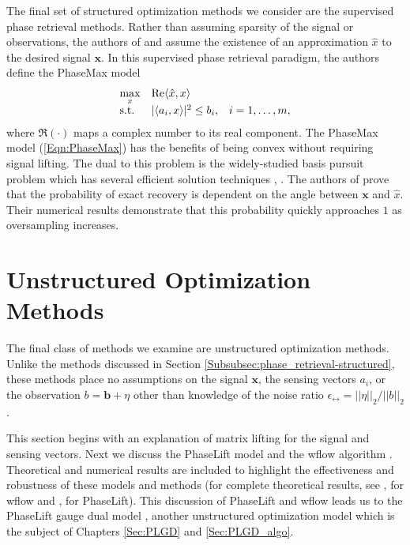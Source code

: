 The final set of structured optimization methods we consider are the supervised phase retrieval methods.
Rather than assuming sparsity of the signal or observations, the authors of \cite{goldstein2018phasemax} and \cite{bahmani2016phase} assume the existence of an approximation $\hat{x}$ to the desired signal $\mathbf{x}$.  In this supervised phase retrieval paradigm, the authors define the PhaseMax model
\begin{equation} 			\label{Eqn:PhaseMax}
\begin{array}{lll}
	\max\limits_x	&	\mathrm{Re} \langle \hat{x}, x \rangle 		\\
	\textnormal{s.t.} 			&	| \langle a_i, x \rangle |^2 \leq b_i, 	&	i = 1, \ldots, m,
\end{array}
\end{equation} 
where $\Re(\cdot)$ maps a complex number to its real component.  The PhaseMax model (\ref{Eqn:PhaseMax}) has the benefits of being convex without requiring signal lifting.  The dual to this problem is the widely-studied basis pursuit problem which has several efficient solution techniques \cite{chen2001atomic}, \cite{candes2006stable}.  The authors of \cite{goldstein2018phasemax} prove that the probability of exact recovery is dependent on the angle between $\mathbf{x}$ and $\hat{x}$.
Their numerical results demonstrate that this probability quickly approaches $1$ as oversampling increases.





\section{Unstructured Optimization Methods}	 	\label{Subsubsec:phase_retrieval-unstructured}


The final class of methods we examine are unstructured optimization methods.  Unlike the methods discussed in Section \ref{Subsubsec:phase_retrieval-structured}, these methods place no assumptions on the signal $\mathbf{x}$, the sensing vectors $a_i$, or the observation $b = \mathbf{b} + \eta$ other than knowledge of the noise ratio $\epsilon_\rel = ||\eta||_2 / ||b||_2$.

This section begins with an explanation of matrix lifting for the signal and sensing vectors.  
Next we discuss the PhaseLift model \cite{DBLP:journals/siamis/CandesESV13} and the wflow algorithm \cite{DBLP:journals/tit/CandesLS15}.   
Theoretical and numerical results are included to highlight the effectiveness and robustness of these models and methods (for complete theoretical results, see \cite{DBLP:journals/tit/CandesLS15},  \cite{sun2016geometric} for wflow and \cite{candes2014solving}, \cite{candes2013phaselift} for PhaseLift).  
This discussion of PhaseLift and wflow leads us to the PhaseLift gauge dual model \cite{DBLP:journals/siamsc/FriedlanderM16}, another unstructured optimization model which is the subject of Chapters \ref{Sec:PLGD} and \ref{Sec:PLGD_algo}.


